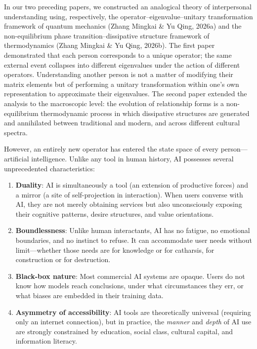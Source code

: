 ﻿\documentclass[12pt,a4paper]{article}
\begin{document}
In our two preceding papers, we constructed an analogical theory of interpersonal understanding using, respectively, the operator--eigenvalue--unitary transformation framework of quantum mechanics (Zhang Mingkai \& Yu Qing, 2026a) and the non-equilibrium phase transition--dissipative structure framework of thermodynamics (Zhang Mingkai \& Yu Qing, 2026b). The first paper demonstrated that each person corresponds to a unique operator; the same external event collapses into different eigenvalues under the action of different operators. Understanding another person is not a matter of modifying their matrix elements but of performing a unitary transformation within one's own representation to approximate their eigenvalues. The second paper extended the analysis to the macroscopic level: the evolution of relationship forms is a non-equilibrium thermodynamic process in which dissipative structures are generated and annihilated between traditional and modern, and across different cultural spectra.

However, an entirely new operator has entered the state space of every person---artificial intelligence. Unlike any tool in human history, AI possesses several unprecedented characteristics:

\begin{enumerate}[label=(\arabic*)]
\item \textbf{Duality}: AI is simultaneously a tool (an extension of productive forces) and a mirror (a site of self-projection in interaction). When users converse with AI, they are not merely obtaining services but also unconsciously exposing their cognitive patterns, desire structures, and value orientations.
\item \textbf{Boundlessness}: Unlike human interactants, AI has no fatigue, no emotional boundaries, and no instinct to refuse. It can accommodate user needs without limit---whether those needs are for knowledge or for catharsis, for construction or for destruction.
\item \textbf{Black-box nature}: Most commercial AI systems are opaque. Users do not know how models reach conclusions, under what circumstances they err, or what biases are embedded in their training data.
\item \textbf{Asymmetry of accessibility}: AI tools are theoretically universal (requiring only an internet connection), but in practice, the \textit{manner} and \textit{depth} of AI use are strongly constrained by education, social class, cultural capital, and information literacy.
\end{enumerate}
\end{document}
